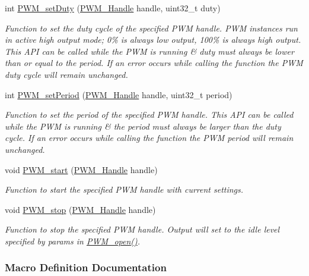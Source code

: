 \begin{DoxyCompactItemize}
int \hyperlink{_p_w_m_8h_a90979a3b8d525f266c2b82e012f68cee}{P\+W\+M\+\_\+set\+Duty} (\hyperlink{_p_w_m_8h_afdefc765f42bbad4dca246fda6e1354b}{P\+W\+M\+\_\+\+Handle} handle, uint32\+\_\+t duty)
\begin{DoxyCompactList}\small\item\em Function to set the duty cycle of the specified P\+W\+M handle. P\+W\+M instances run in active high output mode; 0\% is always low output, 100\% is always high output. This A\+P\+I can be called while the P\+W\+M is running \& duty must always be lower than or equal to the period. If an error occurs while calling the function the P\+W\+M duty cycle will remain unchanged. \end{DoxyCompactList}\item 
int \hyperlink{_p_w_m_8h_ae40714354f46dd6d30dbfb14473c73e0}{P\+W\+M\+\_\+set\+Period} (\hyperlink{_p_w_m_8h_afdefc765f42bbad4dca246fda6e1354b}{P\+W\+M\+\_\+\+Handle} handle, uint32\+\_\+t period)
\begin{DoxyCompactList}\small\item\em Function to set the period of the specified P\+W\+M handle. This A\+P\+I can be called while the P\+W\+M is running \& the period must always be larger than the duty cycle. If an error occurs while calling the function the P\+W\+M period will remain unchanged. \end{DoxyCompactList}\item 
void \hyperlink{_p_w_m_8h_aa1bd0cc3f0fa52879422fca74d254378}{P\+W\+M\+\_\+start} (\hyperlink{_p_w_m_8h_afdefc765f42bbad4dca246fda6e1354b}{P\+W\+M\+\_\+\+Handle} handle)
\begin{DoxyCompactList}\small\item\em Function to start the specified P\+W\+M handle with current settings. \end{DoxyCompactList}\item 
void \hyperlink{_p_w_m_8h_ae83a4cd327a07d6037ff1a8d72fb3ae6}{P\+W\+M\+\_\+stop} (\hyperlink{_p_w_m_8h_afdefc765f42bbad4dca246fda6e1354b}{P\+W\+M\+\_\+\+Handle} handle)
\begin{DoxyCompactList}\small\item\em Function to stop the specified P\+W\+M handle. Output will set to the idle level specified by params in \hyperlink{_p_w_m_8h_ac963beab0c5c6901bf852f175028aeaf}{P\+W\+M\+\_\+open()}. \end{DoxyCompactList}\end{DoxyCompactItemize}


\subsubsection{Macro Definition Documentation}

